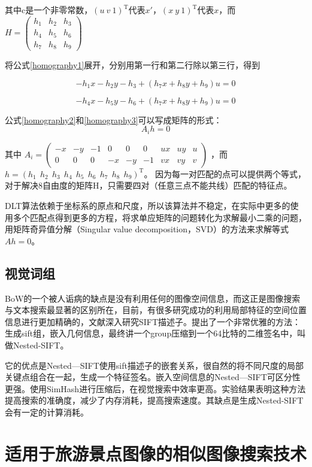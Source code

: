 其中c是一个非零常数，\((u\ v\ 1)^\mathrm{T}\)代表\(x'\)，\((x \ y \ 1)^\mathrm{T}\)代表\(x\)，而
\(
H = 
\begin{pmatrix}
h_1 & h_2 & h_3 \\
h_4 & h_5 & h_6 \\
h_7 & h_8 & h_9
\end{pmatrix}
\)

将公式\eqref{homography1}展开，分别用第一行和第二行除以第三行，得到

\begin{equation}
\label{homography2}
-h_1x - h_2y - h_3 + (h_7x+h_8y+h_9)u = 0
\end{equation}

\begin{equation}
\label{homography3}
-h_4x - h_5y - h_6 + (h_7x+h_8y+h_9)u = 0
\end{equation}

公式\eqref{homography2}和\eqref{homography3}可以写成矩阵的形式：
\begin{equation}
\label{homography4}
A_ih = 0
\end{equation}

其中
\(A_i = 
\begin{pmatrix}
-x & -y & -1 & 0 & 0 & 0 &ux & uy & u \\
0 & 0 & 0 & -x & -y & -1 &vx & vy & v 
\end{pmatrix}\)
，而
\(h = (h_1 \ \ h_2 \ \ h_3 \ \ h_4 \ \ h_5 \ \ h_6 \ \ h_7 \ \ h_8 \ \ h_9)^\mathrm{T}\)。
因为每一对匹配的点可以提供两个等式，对于解决8自由度的矩阵H，只需要四对（任意三点不能共线）匹配的特征点。

DLT算法依赖于坐标系的原点和尺度，所以该算法并不稳定，在实际中更多的使用多个匹配点得到更多的方程，将求单应矩阵的问题转化为求解最小二乘的问题，用矩阵奇异值分解（Singular value decomposition，SVD）的方法来求解等式\(Ah = 0\)。

\subsection{视觉词组}

BoW的一个被人诟病的缺点是没有利用任何的图像空间信息，而这正是图像搜索与文本搜索最显著的区别所在，目前，有很多研究成功的利用局部特征的空间位置信息进行更加精确的，文献\cite{Xu:2013wc}深入研究SIFT描述子。提出了一个非常优雅的方法：生成sift组，嵌入几何信息，最终讲一个group压缩到一个64比特的二维签名中，叫做Nested-SIFT。

它的优点是Nested—SIFT使用sift描述子的嵌套关系，很自然的将不同尺度的局部关键点组合在一起，生成一个特征签名。嵌入空间信息的Nested—SIFT可区分性更强。使用SimHash进行压缩后，在视觉搜索中效率更高。实验结果表明这种方法提高搜索的准确度，减少了内存消耗，提高搜索速度。其缺点是生成Nested-SIFT会有一定的计算消耗。

\section{适用于旅游景点图像的相似图像搜索技术}

\ifx\usechapbib\empty
\nocite{BSTcontrol}


\fi